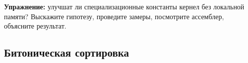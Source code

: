 \documentclass[a4paper,12pt,oneside]{article}
\begin{document}
\textbf{Упражнение:} улучшат ли специализационные константы кернел без локальной памяти? Выскажите гипотезу, проведите замеры, посмотрите ассемблер, объясните результат.

\subsection{Битоническая сортировка}\label{subsec:bitonic}

\end{document}
